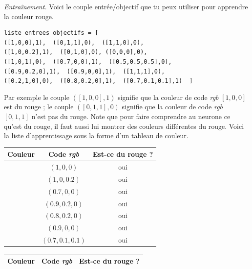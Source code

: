 \documentclass[11pt,class=report,crop=false]{standalone}
\begin{document}
\begin{activite}[Neurone]
\begin{enumerate}
	\emph{Entraînement.}
	Voici le couple entrée/objectif que tu peux utiliser pour apprendre la couleur rouge. 
	
	\begin{center}
	\begin{minipage}{0.8\textwidth}
	\begin{lstlisting}
liste_entrees_objectifs = [ 
([1,0,0],1),  ([0,1,1],0),  ([1,1,0],0),
([1,0,0.2],1),  ([0,1,0],0), ([0,0,0],0),
([1,0,1],0),  ([0.7,0,0],1),  ([0.5,0.5,0.5],0),
([0.9,0.2,0],1),  ([0.9,0,0],1),  ([1,1,1],0),
([0.2,1,0],0),  ([0.8,0.2,0],1),  ([0.7,0.1,0.1],1)  ]
	\end{lstlisting}
	\end{minipage}
	\end{center}
Par exemple le couple $([1,0,0],1)$ signifie que la couleur
de code \emph{rgb} $[1,0,0]$ est du rouge ; le couple $([0,1,1],0)$ signifie que la couleur
de code \emph{rgb} $[0,1,1]$ n'est pas du rouge.
Note que pour faire comprendre au neurone ce qu'est du rouge, il faut aussi lui montrer des couleurs différentes du rouge. Voici la liste d'apprentissage sous la forme d'un tableau de couleur.


\begin{center}
	\begin{tabular}{|c|c|c|}
		\hline
		Couleur &  Code \emph{rgb}  & Est-ce du rouge ? \\ \hline\hline
		
		\cellcolor{red1}  & $(1,0,0)$ & oui \\ \hline
        \cellcolor{red2}  & $(1,0,0.2)$ & oui \\ \hline
		\cellcolor{red3}  & $(0.7,0,0)$ & oui \\ \hline
		\cellcolor{red4}  & $(0.9,0.2,0)$ & oui \\ \hline  
		\cellcolor{red5}  & $(0.8,0.2,0)$ & oui \\ \hline
		\cellcolor{red6}  & $(0.9,0,0)$ & oui \\ \hline
		\cellcolor{red7}  & $(0.7,0.1,0.1)$ & oui \\ \hline		         
	\end{tabular}\qquad 
	\begin{tabular}{|c|c|c|}
	\hline
	Couleur &  Code \emph{rgb}  & Est-ce du rouge ? \\ \hline\hline
	

\end{tabular}
\end{center}
\end{enumerate}
\end{activite}
\end{document}

